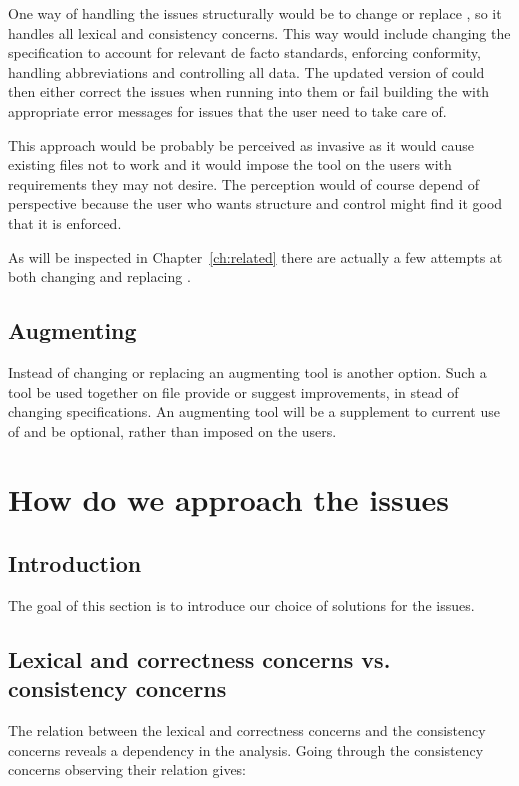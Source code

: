 One way of handling the issues structurally would be to change or
replace {\bibtex}, so it handles all lexical and consistency concerns.
This way would include changing the {\bibtex} specification to account
for relevant de facto standards, enforcing conformity, handling
abbreviations and controlling all data.  The updated version of
{\bibtex} could then either correct the issues when running into them
or fail building the  with appropriate error messages for
issues that the user need to take care of.

This approach would be probably be perceived as invasive as it would
cause existing {\bibtex} files not to work and it would impose the
tool on the users with requirements they may not desire.  The
perception would of course depend of perspective because the user who
wants structure and control might find it good that it is enforced.

As will be inspected in Chapter~\ref{ch:related} there are actually a
few attempts at both changing and replacing {\bibtex}.


\subsection{Augmenting {\bibtex}}

Instead of changing or replacing {\bibtex} an augmenting tool is
another option.  Such a tool be used together on {\bibtex} file
provide or suggest improvements, in stead of changing specifications.
An augmenting tool will be a supplement to current use of {\bibtex}
and be optional, rather than imposed on the users.


\section{How do we approach the {\bibtex} issues}
\subsection{Introduction}

The goal of this section is to introduce our choice of solutions for
the issues.


\subsection{Lexical and correctness concerns vs. consistency concerns}
\label{sec:approach_lexical_consistency}

The relation between the lexical and correctness concerns and the
consistency concerns reveals a dependency in the analysis.  Going
through the consistency concerns observing their relation gives:

